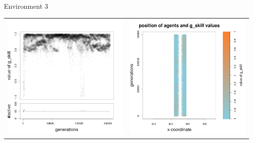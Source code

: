 \documentclass[8pt, handout=show,notes=show]{beamer}
\begin{document}
\begin{frame}{Environment 3}

\begin{table}[H]
\centering
\begin{tabular}{cc}
 \includegraphics[width=\imgSize]{../images/5StaticEnv/Gplot51_staticEnv3}&\includegraphics[width=\imgSize]{../images/5StaticEnv/Gplot51Static_staticEnv3}\\

\end{tabular}
\end{table}
\end{frame}
\end{document}
